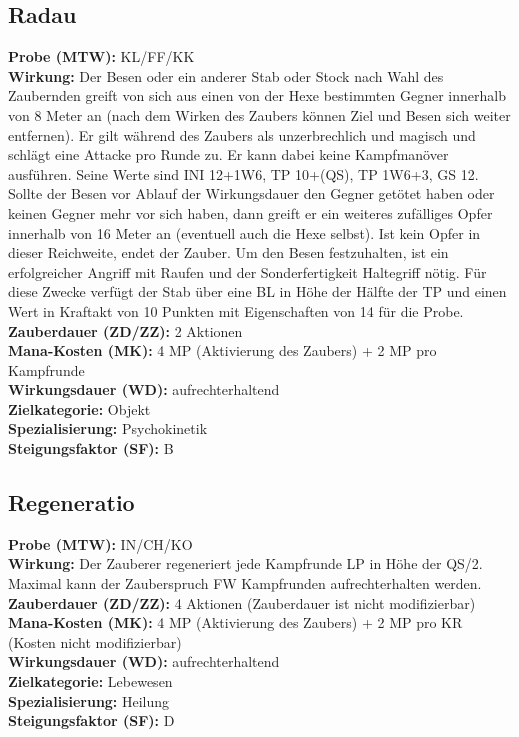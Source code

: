 \subsection{Radau}
\label{chap:radau}
\textbf{Probe (MTW):} KL/FF/KK \\
\textbf{Wirkung:} Der Besen oder ein anderer Stab oder Stock nach Wahl des Zaubernden greift von sich aus einen von der Hexe bestimmten Gegner innerhalb von 8 Meter an (nach dem Wirken des Zaubers können Ziel und Besen sich weiter entfernen). Er gilt während des Zaubers als unzerbrechlich und magisch und schlägt eine Attacke pro Runde zu. Er kann dabei keine Kampfmanöver ausführen. Seine Werte sind INI 12+1W6, TP 10+(QS), TP 1W6+3, GS 12. Sollte der Besen vor Ablauf der Wirkungsdauer den Gegner getötet haben oder keinen Gegner mehr vor sich haben, dann greift er ein weiteres zufälliges Opfer innerhalb von 16 Meter an (eventuell auch die Hexe selbst). Ist kein Opfer in dieser Reichweite, endet der Zauber. Um den Besen festzuhalten, ist ein erfolgreicher Angriff mit Raufen und der Sonderfertigkeit Haltegriff nötig. Für diese Zwecke verfügt der Stab über eine BL in Höhe der Hälfte der TP und einen Wert in Kraftakt von 10 Punkten mit Eigenschaften von 14 für die Probe. \\
\textbf{Zauberdauer (ZD/ZZ):} 2 Aktionen \\
\textbf{Mana-Kosten (MK):} 4 MP (Aktivierung des Zaubers) + 2 MP pro Kampfrunde \\
\textbf{Wirkungsdauer (WD):} aufrechterhaltend \\
\textbf{Zielkategorie:} Objekt \\
\textbf{Spezialisierung:} Psychokinetik \\
\textbf{Steigungsfaktor (SF):} B


\subsection{Regeneratio}
\label{chap:regeneratio}
\textbf{Probe (MTW):} IN/CH/KO \\
\textbf{Wirkung:} Der Zauberer regeneriert jede Kampfrunde LP in Höhe der QS/2. Maximal kann der Zauberspruch FW Kampfrunden aufrechterhalten werden.\\
\textbf{Zauberdauer (ZD/ZZ):} 4 Aktionen (Zauberdauer ist nicht modifizierbar) \\
\textbf{Mana-Kosten (MK):} 4 MP (Aktivierung des Zaubers) + 2 MP pro KR (Kosten nicht modifizierbar) \\
\textbf{Wirkungsdauer (WD):} aufrechterhaltend \\
\textbf{Zielkategorie:} Lebewesen \\
\textbf{Spezialisierung:} Heilung \\
\textbf{Steigungsfaktor (SF):} D


